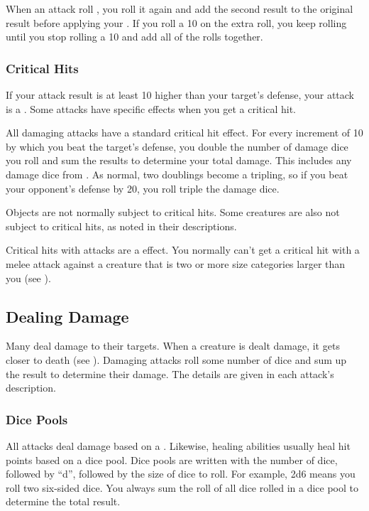             When an attack roll , you roll it again and add the second result to the original result before applying your .
            If you roll a 10 on the extra roll, you keep rolling until you stop rolling a 10 and add all of the rolls together.

        \subsubsection{Critical Hits}\label{Critical Hits}
            If your attack result is at least 10 higher than your target's defense, your attack is a .
            Some attacks have specific effects when you get a critical hit.

            All damaging attacks have a standard critical hit effect.
            For every increment of 10 by which you beat the target's defense, you double the number of damage dice you roll and sum the results to determine your total damage.
            This includes any damage dice from .
            As normal, two doublings become a tripling, so if you beat your opponent's defense by 20, you roll triple the damage dice.

            Objects are not normally subject to critical hits.
            Some creatures are also not subject to critical hits, as noted in their descriptions.

            Critical hits with  attacks are a  effect.
            You normally can't get a critical hit with a melee attack against a creature that is two or more size categories larger than you (see ).

    \subsection{Dealing Damage}\label{Dealing Damage}
        Many  deal damage to their targets.
        When a creature is dealt damage, it gets closer to death (see ).
        Damaging attacks roll some number of dice and sum up the result to determine their damage.
        The details are given in each attack's description.

        \subsubsection{Dice Pools}\label{Dice Pools}
            All attacks deal damage based on a .
            Likewise, healing abilities usually heal hit points based on a dice pool.
            Dice pools are written with the number of dice, followed by ``d'', followed by the size of dice to roll.
            For example, 2d6 means you roll two six-sided dice.
            You always sum the roll of all dice rolled in a dice pool to determine the total result.

